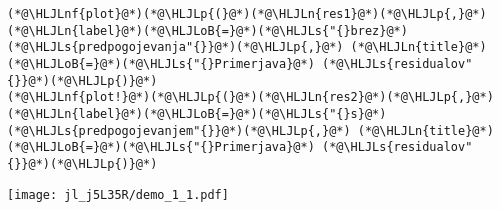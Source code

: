 \documentclass[12pt,a4paper]{article}
\newcommand{\HLJLn}[1]{#1}
\newcommand{\HLJLnf}[1]{\textcolor[RGB]{66,102,213}{#1}}
\newcommand{\HLJLs}[1]{\textcolor[RGB]{201,61,57}{#1}}
\newcommand{\HLJLoB}[1]{\textcolor[RGB]{102,102,102}{\textbf{#1}}}
\newcommand{\HLJLp}[1]{#1}
\begin{document}
\begin{lstlisting}
(*@\HLJLnf{plot}@*)(*@\HLJLp{(}@*)(*@\HLJLn{res1}@*)(*@\HLJLp{,}@*) (*@\HLJLn{label}@*)(*@\HLJLoB{=}@*)(*@\HLJLs{"{}brez}@*) (*@\HLJLs{predpogojevanja"{}}@*)(*@\HLJLp{,}@*) (*@\HLJLn{title}@*)(*@\HLJLoB{=}@*)(*@\HLJLs{"{}Primerjava}@*) (*@\HLJLs{residualov"{}}@*)(*@\HLJLp{)}@*)
(*@\HLJLnf{plot!}@*)(*@\HLJLp{(}@*)(*@\HLJLn{res2}@*)(*@\HLJLp{,}@*) (*@\HLJLn{label}@*)(*@\HLJLoB{=}@*)(*@\HLJLs{"{}s}@*) (*@\HLJLs{predpogojevanjem"{}}@*)(*@\HLJLp{,}@*) (*@\HLJLn{title}@*)(*@\HLJLoB{=}@*)(*@\HLJLs{"{}Primerjava}@*) (*@\HLJLs{residualov"{}}@*)(*@\HLJLp{)}@*)
\end{lstlisting}

\texttt{[image: jl\_j5L35R/demo\_1\_1.pdf]}
\end{document}
